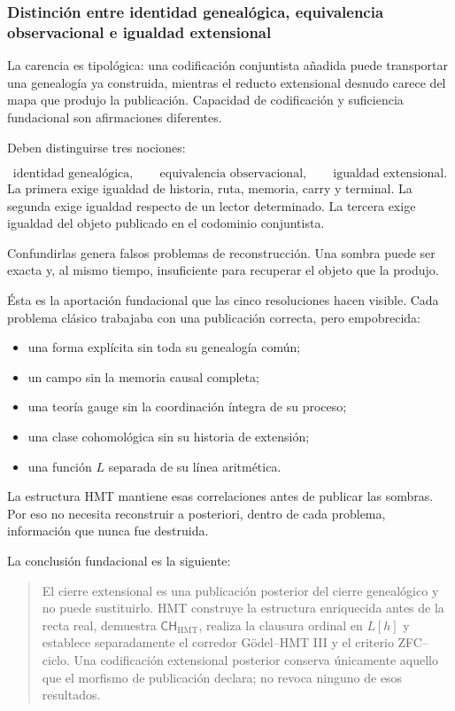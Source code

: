 \subsubsection{Distinción entre identidad genealógica, equivalencia observacional e igualdad extensional}
La carencia es tipológica: una codificación conjuntista añadida puede transportar una genealogía ya construida, mientras el reducto extensional desnudo carece del mapa que produjo la publicación. Capacidad de codificación y suficiencia fundacional son afirmaciones diferentes.\par
Deben distinguirse tres nociones:\par
\[
\text{identidad genealógica},
\qquad
\text{equivalencia observacional},
\qquad
\text{igualdad extensional}.
\]
La primera exige igualdad de historia, ruta, memoria, carry y terminal. La segunda exige igualdad respecto de un lector determinado. La tercera exige igualdad del objeto publicado en el codominio conjuntista.\par
Confundirlas genera falsos problemas de reconstrucción. Una sombra puede ser exacta y, al mismo tiempo, insuficiente para recuperar el objeto que la produjo.\par
Ésta es la aportación fundacional que las cinco resoluciones hacen visible. Cada problema clásico trabajaba con una publicación correcta, pero empobrecida:\par
\begin{itemize}
\item una forma explícita sin toda su genealogía común;
\item un campo sin la memoria causal completa;
\item una teoría gauge sin la coordinación íntegra de su proceso;
\item una clase cohomológica sin su historia de extensión;
\item una función \(L\) separada de su línea aritmética.
\end{itemize}
La estructura HMT mantiene esas correlaciones antes de publicar las sombras. Por eso no necesita reconstruir a posteriori, dentro de cada problema, información que nunca fue destruida.\par
La conclusión fundacional es la siguiente:\par
\begin{quote}
El cierre extensional es una publicación posterior del cierre genealógico y no puede sustituirlo. HMT construye la estructura enriquecida antes de la recta real, demuestra \(\mathsf{CH}_{\mathrm{HMT}}\), realiza la clausura ordinal en \(L[h]\) y establece separadamente el corredor Gödel--HMT III y el criterio ZFC--ciclo. Una codificación extensional posterior conserva únicamente aquello que el morfismo de publicación declara; no revoca ninguno de esos resultados.\par
\end{quote}
